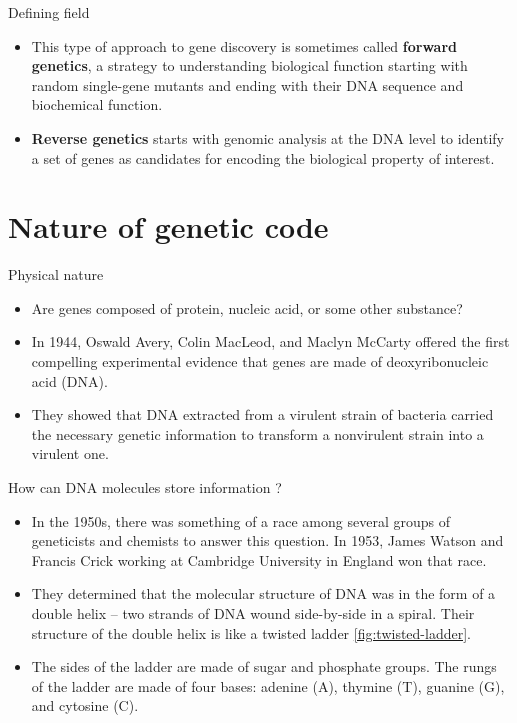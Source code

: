 \documentclass[11pt,dvipsnames,ignorenonframetext,aspectratio=169]{beamer}
\providecommand{\tightlist}{%
  \setlength{\itemsep}{0pt}\setlength{\parskip}{0pt}}
\begin{document}
\begin{frame}{Defining field}
\protect\hypertarget{defining-field}{}
\begin{itemize}
\tightlist
\item
  This type of approach to gene discovery is sometimes called
  \textbf{forward genetics}, a strategy to understanding biological
  function starting with random single-gene mutants and ending with
  their DNA sequence and biochemical function.
\item
  \textbf{Reverse genetics} starts with genomic analysis at the DNA
  level to identify a set of genes as candidates for encoding the
  biological property of interest.
\end{itemize}
\end{frame}

\hypertarget{nature-of-genetic-code}{%
\section{Nature of genetic code}\label{nature-of-genetic-code}}

\begin{frame}{Physical nature}
\protect\hypertarget{physical-nature}{}
\begin{itemize}
\tightlist
\item
  Are genes composed of protein, nucleic acid, or some other substance?
\item
  In 1944, Oswald Avery, Colin MacLeod, and Maclyn McCarty offered the
  first compelling experimental evidence that genes are made of
  deoxyribonucleic acid (DNA).
\item
  They showed that DNA extracted from a virulent strain of bacteria
  carried the necessary genetic information to transform a nonvirulent
  strain into a virulent one.
\end{itemize}
\end{frame}

\begin{frame}{How can DNA molecules store information ?}
\protect\hypertarget{how-can-dna-molecules-store-information}{}
\begin{itemize}
\tightlist
\item
  In the 1950s, there was something of a race among several groups of
  geneticists and chemists to answer this question. In 1953, James
  Watson and Francis Crick working at Cambridge University in England
  won that race.
\item
  They determined that the molecular structure of DNA was in the form of
  a double helix -- two strands of DNA wound side-by-side in a spiral.
  Their structure of the double helix is like a twisted ladder
  \ref{fig:twisted-ladder}.
\item
  The sides of the ladder are made of sugar and phosphate groups. The
  rungs of the ladder are made of four bases: adenine (A), thymine (T),
  guanine (G), and cytosine (C).
\end{itemize}
\end{frame}
\end{document}
